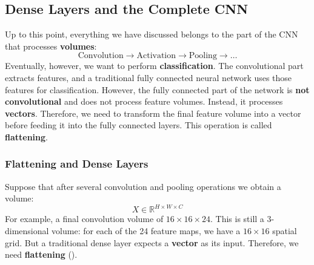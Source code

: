 \subsection{Dense Layers and the Complete CNN}\label{sec:dense-layers-and-the-complete-cnn}

Up to this point, everything we have discussed belongs to the part of the CNN that processes \textbf{volumes}:
\begin{equation*}
    \text{Convolution} \to \text{Activation} \to \text{Pooling} \to \dots
\end{equation*}
Eventually, however, we want to perform \textbf{classification}. The convolutional part extracts features, and a traditional fully connected neural network uses those features for classification. However, the fully connected part of the network is \textbf{not convolutional} and does not process feature volumes. Instead, it processes \textbf{vectors}. Therefore, we need to transform the final feature volume into a vector before feeding it into the fully connected layers. This operation is called \textbf{flattening}.

\longline

\subsubsection{Flattening and Dense Layers}\label{sec:flattening-and-dense-layers}

Suppose that after several convolution and pooling operations we obtain a volume:
\begin{equation*}
    X \in \mathbb{R}^{H \times W \times C}
\end{equation*}
For example, a final convolution volume of $16 \times 16 \times 24$. This is still a 3-dimensional volume: for each of the 24 feature maps, we have a $16 \times 16$ spatial grid. But a traditional dense layer expects a \textbf{vector} as its input. Therefore, we need \textbf{flattening} ().

